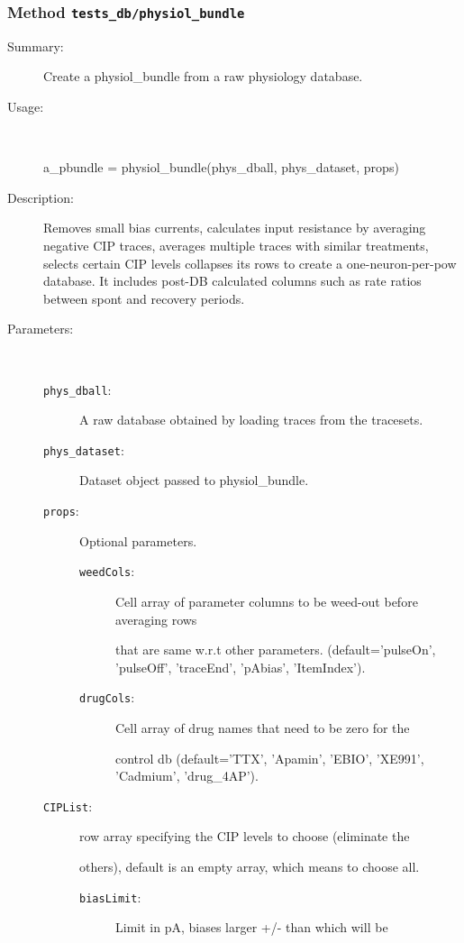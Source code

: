 \subsubsection[Method \texttt{physiol\_bundle}]{Method \texttt{tests\_db/physiol\_bundle}}%
%
\label{ref_tests_db__physiol_bundle}%
\hypertarget{ref_tests_db__physiol_bundle}{}%
\begin{description}
\item[Summary:]Create a physiol\_bundle from a raw physiology database.
%
\item[Usage:]~%
\begin{lyxcode}%
a\_pbundle = physiol\_bundle(phys\_dball, phys\_dataset, props)
%
\end{lyxcode}%
%
\item[Description:]%
Removes small bias currents, calculates input resistance by averaging
 negative CIP traces, averages multiple traces with similar treatments,
 selects certain CIP levels collapses its rows to create a
 one-neuron-per-pow database. It includes post-DB calculated columns
 such as rate ratios between spont and recovery periods.
\item[Parameters:]~
\begin{description}%
\item[\texttt{phys\_dball}:]
 A raw database obtained by loading traces from the tracesets.
\item[\texttt{phys\_dataset}:]
 Dataset object passed to physiol\_bundle.
\item[\texttt{props}:]
 Optional parameters.
\begin{description}%
\item[\texttt{weedCols}:]
 Cell array of parameter columns to be weed-out before averaging rows

that are same w.r.t other parameters.
(default={'pulseOn', 'pulseOff', 'traceEnd', 'pAbias', 'ItemIndex'}).
\item[\texttt{drugCols}:]
 Cell array of drug names that need to be zero for the

control db (default={'TTX', 'Apamin', 'EBIO', 'XE991', 'Cadmium', 'drug\_4AP'}).
\end{description}%
\item[\texttt{CIPList}:]
 row array specifying the CIP levels to choose (eliminate the

others), default is an empty array, which means to choose all.
\begin{description}%
\item[\texttt{biasLimit}:]
 Limit in pA, biases larger +/- than which will be


\end{description}
\end{description}
\end{description}
